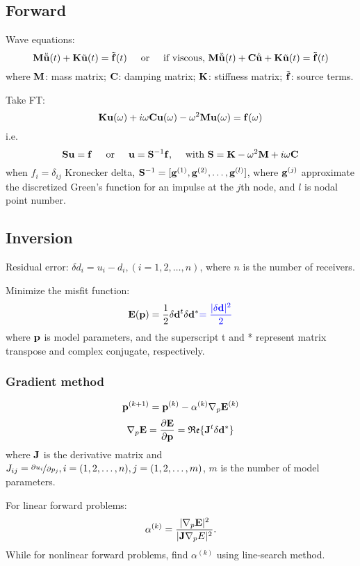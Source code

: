 \subsection{Forward}
Wave equations:
\[ \mathbf{M}\ddot{\tilde{\mathbf{u}}}(t)+\mathbf{K}\tilde{\mathbf{u}}(t)=\tilde{\mathbf{f}}(t) \text{\hspace{5mm}or\hspace{5mm}if viscous,~} \mathbf{M}\ddot{\tilde{\mathbf{u}}}(t)+\mathbf{C}\dot{\tilde{\mathbf{u}}}+\mathbf{K}\tilde{\mathbf{u}}(t)=\tilde{\mathbf{f}}(t) \]
where $\mathbf{M}$: mass matrix; $\mathbf{C}$: damping matrix; $\mathbf{K}$:
stiffness matrix; $\tilde{\mathbf{f}}$: source terms.

Take FT:
\[ \mathbf{K}\mathbf{u}(\omega)+i\omega\mathbf{C}\mathbf{u}(\omega)-\omega^2\mathbf{M}\mathbf{u}(\omega)=\mathbf{f}(\omega) \]
i.e.
\[ \mathbf{S}\mathbf{u}=\mathbf{f} \text{\hspace{5mm}or\hspace{5mm}} \mathbf{u}=\mathbf{S}^{-1}\mathbf{f} \text{,\hspace{5mm}with~} \mathbf{S}=\mathbf{K}-\omega^2\mathbf{M}+i\omega\mathbf{C} \]
when $f_i=\delta_{ij}$ Kronecker delta,
$\mathbf{S}^{-1}=[\mathbf{g}^{(1)},\mathbf{g}^{(2)},\ldots,\mathbf{g}^{(l)}]$,
where $\mathbf{g}^{(j)}$ approximate the discretized Green's function for an impulse at the $j$th node,
and $l$ is nodal point number.

\subsection{Inversion}
Residual error: $\delta d_i=u_i-d_i,(i=1,2,\ldots,n)$, where $n$ is the number of receivers.

Minimize the misfit function:
\[ \mathbf{E}(\mathbf{p})=\frac{1}{2}\delta\mathbf{d}^t\delta\mathbf{d}^*{\color{blue}=\frac{|\delta\mathbf{d}|^2}{2}} \]
where $\mathbf{p}$ is model parameters, and the superscript t and *
represent matrix transpose and complex conjugate, respectively.

\subsubsection{Gradient method}
\[ \mathbf{p}^{(k+1)}=\mathbf{p}^{(k)}-\alpha^{(k)}\nabla_p\mathbf{E}^{(k)} \]
\[ \nabla_p\mathbf{E}=\frac{\partial\mathbf{E}}{\partial\mathbf{p}}=\mathfrak{Re}\{\mathbf{J}^t\delta\mathbf{d}^*\} \]
where $\mathbf{J}$ is the \Frechet derivative matrix
and $J_{ij}=\nicefrac{\partial u_i}{\partial p_j},i=(1,2,\ldots,n),j=(1,2,\ldots,m)$,
$m$ is the number of model parameters.

For linear forward problems:
\[ \alpha^{(k)}=\frac{|\nabla_p\mathbf{E}|^2}{|\mathbf{J}\nabla_p E|^2}. \]
While for nonlinear forward problems, find $\alpha^{(k)}$ using line-search method.

